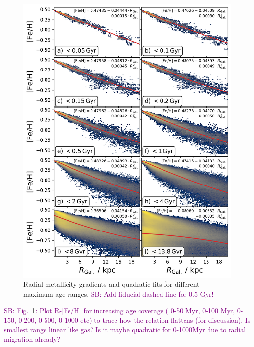 \documentclass[fleqn,usenatbib]{mnras}
\newcommand{\SB}[1]{{\textcolor{purple}{SB: #1}}}
\begin{document}
\begin{figure}
    \centering
    \includegraphics[width=\columnwidth]{figures/quadratic_fit_across_maximum_ages.png}
    \caption{Radial metallicity gradients and quadratic fits for different maximum age ranges. \SB{Add fiducial dashed line for 0.5 Gyr!}}
    \label{fig:quadratic_fit_across_maximum_ages}
\end{figure}

\SB{Fig.~\ref{fig:quadratic_fit_across_maximum_ages}: Plot R-[Fe/H] for increasing age coverage ( 0-50 Myr, 0-100 Myr, 0-150, 0-200, 0-500, 0-1000 etc) to trace how the relation flattens (for discussion). Is smallest range linear like gas? Is it maybe quadratic for 0-1000Myr due to radial migration already?}
\end{document}
